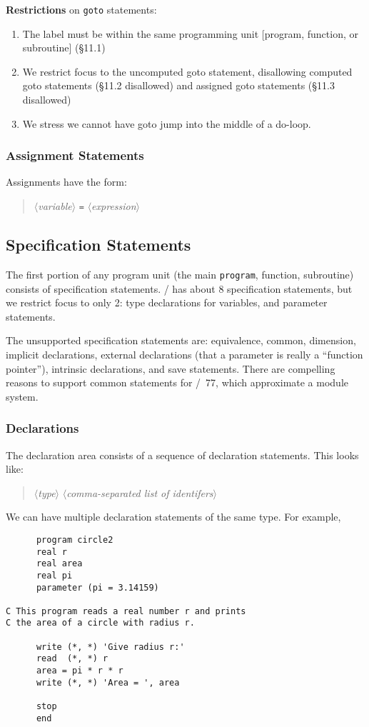 \textbf{Restrictions} on \texttt{goto} statements:
\begin{enumerate}
\item The label must be within the same programming unit [program,
  function, or subroutine] (\S11.1)
\item We restrict focus to the uncomputed goto statement, disallowing
  computed goto statements (\S11.2 disallowed) and assigned goto
  statements (\S11.3 disallowed)
\item We stress we cannot have goto jump into the middle of a do-loop.
\end{enumerate}

\subsubsection{Assignment Statements}
Assignments have the form:
\begin{quote}
$\langle$\textit{variable\/}$\rangle$ \texttt{=} $\langle$\textit{expression\/}$\rangle$
\end{quote}

\subsection{Specification Statements}
The first portion of any program unit (the main \texttt{program}, function, subroutine)
consists of specification statements. \FORTRAN/ has about 8
specification statements, but we restrict focus to only 2: type
declarations for variables, and parameter statements.

The unsupported specification statements are: equivalence, common,
dimension, implicit declarations, external declarations (that a
parameter is really a ``function pointer''), intrinsic declarations, and
save statements. There are compelling reasons to support common
statements for \FORTRAN/~77, which approximate a module system.

\subsubsection{Declarations}
The declaration area consists of a sequence of declaration
statements. This looks like:
\begin{quote}
$\langle$\textit{type\/}$\rangle$ $\langle$\textit{comma-separated list of identifers\/}$\rangle$
\end{quote}
We can have multiple declaration statements of the same type. For
example,
\begin{lstlisting}
      program circle2
      real r
      real area
      real pi
      parameter (pi = 3.14159)

C This program reads a real number r and prints
C the area of a circle with radius r.

      write (*, *) 'Give radius r:'
      read  (*, *) r
      area = pi * r * r
      write (*, *) 'Area = ', area

      stop
      end
\end{lstlisting}

